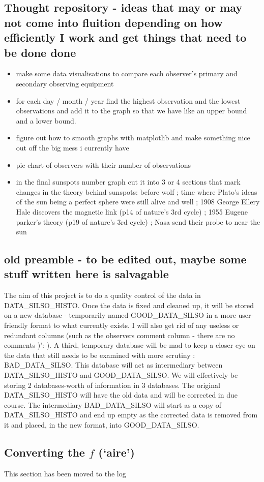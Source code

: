 \documentclass[12pt]{article}
\begin{document}

\subsection{Thought repository - ideas that may or may not come into fluition depending on how efficiently I work and get things that need to be done done}
\begin{itemize}
    \item make some data visualisations to compare each observer's primary and secondary observing equipment
    \item for each day / month / year find the highest observation and the lowest observations and add it to the graph so that we have like an upper bound and a lower bound. 
    \item figure out how to smooth graphs with matplotlib and make something nice out off the big mess i currently have
    \item pie chart of observers with their number of observations
    \item in the final sunspots number graph cut it into 3 or 4 sections that mark changes in the theory behind sunspots: before wolf ; time where Plato's ideas of the sun being a perfect sphere were still alive and well ; 1908 George Ellery Hale discovers the magnetic link (p14 of nature's 3rd cycle) ; 1955 Eugene parker's theory (p19 of nature's 3rd cycle) ; Nasa send their probe to near the sun
\end{itemize}

\subsection{old preamble - to be edited out, maybe some stuff written here is salvagable}
The aim of this project is to do a quality control of the data in DATA\_SILSO\_HISTO. Once the data is fixed and cleaned up, it will be stored on a new database - temporarily named GOOD\_DATA\_SILSO in a more user-friendly format to what currently exists. I will also get rid of any useless or redundant columns (such as the observers comment column - there are no comments )': ). A third, temporary database will be mad to keep a closer eye on the data that still needs to be examined with more scrutiny : BAD\_DATA\_SILSO. This database will act as intermediary between DATA\_SILSO\_HISTO and GOOD\_DATA\_SILSO. We will effectively be storing 2 databases-worth of information in 3 databases. The original DATA\_SILSO\_HISTO will have the old data and will be corrected in due course. The intermediary BAD\_DATA\_SILSO will start as a copy of DATA\_SILSO\_HISTO and end up empty as the corrected data is removed from it and placed, in the new format, into GOOD\_DATA\_SILSO.

\subsection{Converting the $f$ (`aire')}\label{converting the `aire'}
This section has been moved to the log
\end{document}
